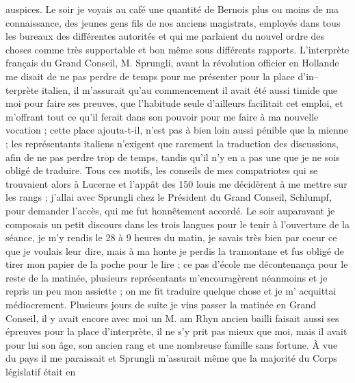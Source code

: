 \documentclass[12pt]{article}
\begin{document}
auspices. Le soir je voyais au café une quantité de Bernois plus ou moins de ma connaissance, des
jeunes gens fils de nos anciens magistrats, employés dans tous les bureaux des différentes autorités
et qui me parlaient du nouvel ordre des choses comme très supportable et bon même sous différents
rapports. L’interprète français du Grand Conseil, M. Sprungli, avant la révolution officier en
Hollande me disait de ne pas perdre de temps pour me présenter pour la place d’in–terprète italien,
il m’assurait qu’au commencement il avait été aussi timide que moi pour faire ses preuves, que
l’habitude seule d’ailleurs facilitait cet emploi, et m’offrant tout ce qu’il ferait dans son
pouvoir pour me faire à ma nouvelle vocation ; cette place ajouta-t-il, n’est pas à bien loin aussi
pénible que la mienne ; les représentants italiens n’exigent que rarement la traduction des
discussions, afin de ne pas perdre trop de temps, tandis qu’il n’y en a pas une que je ne sois
obligé de traduire. Tous ces motifs, les conseils de mes compatriotes qui se trouvaient alors à
Lucerne et l’appât des 150 louis me décidèrent à me mettre sur les rangs ; j’allai avec Sprungli
chez le Président du Grand Conseil, Schlumpf, pour demander l’accès, qui me fut honnêtement accordé.
Le soir auparavant je composais un petit discours dans les trois langues pour le tenir à l’ouverture
de la séance, je m’y rendis le 28 à 9 heures du matin, je savais très bien par coeur ce que je
voulais leur dire, mais à ma honte je perdis la tramontane et fus obligé de tirer mon papier de la
poche pour le lire ; ce pas d’école me décontenança pour le reste de la matinée, plusieurs
représentants m’encouragèrent néanmoins et je repris un peu mon assiette ; on me fit traduire
quelque chose et je m’ acquittai médiocrement. Plusieurs jours de suite je vins passer la matinée en
Grand Conseil, il y avait encore avec moi un M. am Rhyn ancien bailli faisait aussi ses épreuves
pour la place d’interprète, il ne s’y prit pas mieux que moi, mais il avait pour lui son âge, son
ancien rang et une nombreuse famille sans fortune. À vue du pays il me paraissait et Sprungli
m’assurait même que la majorité du Corps législatif était en
\end{document}
